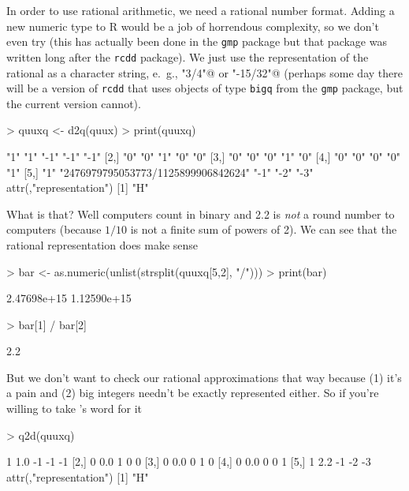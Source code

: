 \documentclass{article}
\begin{document}
In order to use rational arithmetic, we need a rational number format.
Adding a new numeric type to R would be a job of horrendous complexity,
so we don't even try (this has actually been done in the \texttt{gmp} package
but that package was written long after the \texttt{rcdd} package).
We just use the representation of the rational
as a character string, e.~g., \verb@"3/4"@ or \verb@"-15/32"@
(perhaps some day there will be a version of \texttt{rcdd} that uses objects
of type \texttt{bigq} from the \texttt{gmp} package, but the current version
cannot).
\begin{Schunk}
\begin{Sinput}
> quuxq <- d2q(quux)
> print(quuxq)
\end{Sinput}
\begin{Soutput}
     [,1] [,2]                                [,3] [,4] [,5]
[1,] "1"  "1"                                 "-1" "-1" "-1"
[2,] "0"  "0"                                 "1"  "0"  "0" 
[3,] "0"  "0"                                 "0"  "1"  "0" 
[4,] "0"  "0"                                 "0"  "0"  "1" 
[5,] "1"  "2476979795053773/1125899906842624" "-1" "-2" "-3"
attr(,"representation")
[1] "H"
\end{Soutput}
\end{Schunk}
What is that?  Well computers count in binary and 2.2 is
\emph{not} a round number to computers (because $1/10$ is not a finite sum
of powers of 2).
We can see that the rational representation does make sense
\begin{Schunk}
\begin{Sinput}
> bar <- as.numeric(unlist(strsplit(quuxq[5,2], "/")))
> print(bar)
\end{Sinput}
\begin{Soutput}
[1] 2.47698e+15 1.12590e+15
\end{Soutput}
\begin{Sinput}
> bar[1] / bar[2]
\end{Sinput}
\begin{Soutput}
[1] 2.2
\end{Soutput}
\end{Schunk}
But we don't want to check our rational approximations that way
because (1) it's a pain and (2) big integers needn't be
exactly represented either.  So if you're willing to take
\verb@rcdd@'s word for it
\begin{Schunk}
\begin{Sinput}
> q2d(quuxq)
\end{Sinput}
\begin{Soutput}
     [,1] [,2] [,3] [,4] [,5]
[1,]    1  1.0   -1   -1   -1
[2,]    0  0.0    1    0    0
[3,]    0  0.0    0    1    0
[4,]    0  0.0    0    0    1
[5,]    1  2.2   -1   -2   -3
attr(,"representation")
[1] "H"
\end{Soutput}
\end{Schunk}
\end{document}
